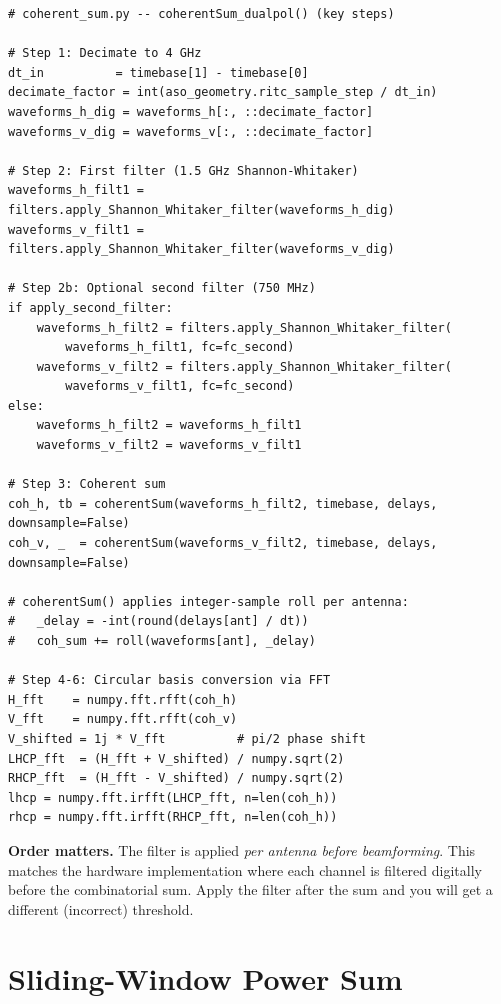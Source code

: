 \documentclass[11pt,letterpaper]{article}
\newenvironment{codebox}{%
  \begin{mdframed}[backgroundcolor=codebg,linewidth=0.5pt,innerleftmargin=6pt,innerrightmargin=6pt,innertopmargin=4pt,innerbottommargin=4pt]%
  \small}{\end{mdframed}}
\begin{document}
\begin{codebox}
\begin{Verbatim}
# coherent_sum.py -- coherentSum_dualpol() (key steps)

# Step 1: Decimate to 4 GHz
dt_in          = timebase[1] - timebase[0]
decimate_factor = int(aso_geometry.ritc_sample_step / dt_in)
waveforms_h_dig = waveforms_h[:, ::decimate_factor]
waveforms_v_dig = waveforms_v[:, ::decimate_factor]

# Step 2: First filter (1.5 GHz Shannon-Whitaker)
waveforms_h_filt1 = filters.apply_Shannon_Whitaker_filter(waveforms_h_dig)
waveforms_v_filt1 = filters.apply_Shannon_Whitaker_filter(waveforms_v_dig)

# Step 2b: Optional second filter (750 MHz)
if apply_second_filter:
    waveforms_h_filt2 = filters.apply_Shannon_Whitaker_filter(
        waveforms_h_filt1, fc=fc_second)
    waveforms_v_filt2 = filters.apply_Shannon_Whitaker_filter(
        waveforms_v_filt1, fc=fc_second)
else:
    waveforms_h_filt2 = waveforms_h_filt1
    waveforms_v_filt2 = waveforms_v_filt1

# Step 3: Coherent sum
coh_h, tb = coherentSum(waveforms_h_filt2, timebase, delays, downsample=False)
coh_v, _  = coherentSum(waveforms_v_filt2, timebase, delays, downsample=False)

# coherentSum() applies integer-sample roll per antenna:
#   _delay = -int(round(delays[ant] / dt))
#   coh_sum += roll(waveforms[ant], _delay)

# Step 4-6: Circular basis conversion via FFT
H_fft    = numpy.fft.rfft(coh_h)
V_fft    = numpy.fft.rfft(coh_v)
V_shifted = 1j * V_fft          # pi/2 phase shift
LHCP_fft  = (H_fft + V_shifted) / numpy.sqrt(2)
RHCP_fft  = (H_fft - V_shifted) / numpy.sqrt(2)
lhcp = numpy.fft.irfft(LHCP_fft, n=len(coh_h))
rhcp = numpy.fft.irfft(RHCP_fft, n=len(coh_h))
\end{Verbatim}
\end{codebox}

\noindent\textbf{Order matters.} The filter is applied \emph{per antenna
before beamforming}. This matches the hardware implementation where each
channel is filtered digitally before the combinatorial sum. Apply the filter
after the sum and you will get a different (incorrect) threshold.

\section{Sliding-Window Power Sum}
\end{document}
